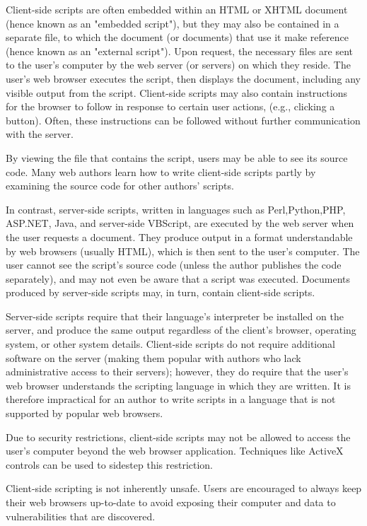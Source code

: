 Client-side scripts are often embedded within an HTML or XHTML document (hence known as an "embedded script"), but they may also be contained in a separate file, to which the document (or documents) that use it make reference (hence known as an "external script"). Upon request, the necessary files are sent to the user's computer by the web server (or servers) on which they reside. The user's web browser executes the script, then displays the document, including any visible output from the script. Client-side scripts may also contain instructions for the browser to follow in response to certain user actions, (e.g., clicking a button). Often, these instructions can be followed without further communication with the server.

By viewing the file that contains the script, users may be able to see its source code. Many web authors learn how to write client-side scripts partly by examining the source code for other authors' scripts.

In contrast, server-side scripts, written in languages such as Perl,Python,PHP, ASP.NET, Java, and server-side VBScript, are executed by the web server when the user requests a document. They produce output in a format understandable by web browsers (usually HTML), which is then sent to the user's computer. The user cannot see the script's source code (unless the author publishes the code separately), and may not even be aware that a script was executed. Documents produced by server-side scripts may, in turn, contain client-side scripts.

Server-side scripts require that their language's interpreter be installed on the server, and produce the same output regardless of the client's browser, operating system, or other system details. Client-side scripts do not require additional software on the server (making them popular with authors who lack administrative access to their servers); however, they do require that the user's web browser understands the scripting language in which they are written. It is therefore impractical for an author to write scripts in a language that is not supported by popular web browsers.

Due to security restrictions, client-side scripts may not be allowed to access the user's computer beyond the web browser application. Techniques like ActiveX controls can be used to sidestep this restriction.

Client-side scripting is not inherently unsafe. Users are encouraged to always keep their web browsers up-to-date to avoid exposing their computer and data to vulnerabilities that are discovered.

